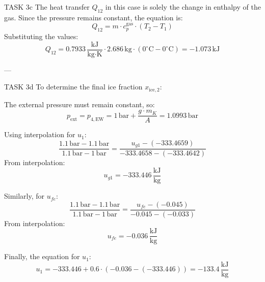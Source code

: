 TASK 3c  
The heat transfer \( Q_{12} \) in this case is solely the change in enthalpy of the gas. Since the pressure remains constant, the equation is:  
\[
Q_{12} = m \cdot c_p^{\text{gas}} \cdot (T_2 - T_1)
\]  
Substituting the values:  
\[
Q_{12} = 0.7933 \, \frac{\text{kJ}}{\text{kg·K}} \cdot 2.686 \, \text{kg} \cdot (0^\circ\text{C} - 0^\circ\text{C}) = -1.073 \, \text{kJ}
\]  

---

TASK 3d  
To determine the final ice fraction \( x_{\text{ice},2} \):  

The external pressure must remain constant, so:  
\[
p_{\text{ext}} = p_{4,\text{EW}} = 1 \, \text{bar} + \frac{g \cdot m_K}{A} = 1.0993 \, \text{bar}
\]  

Using interpolation for \( u_1 \):  
\[
\frac{1.1 \, \text{bar} - 1.1 \, \text{bar}}{1.1 \, \text{bar} - 1 \, \text{bar}} = \frac{u_{g1} - (-333.4659)}{-333.4658 - (-333.4642)}
\]  
From interpolation:  
\[
u_{g1} = -333.446 \, \frac{\text{kJ}}{\text{kg}}
\]  

Similarly, for \( u_{fe} \):  
\[
\frac{1.1 \, \text{bar} - 1.1 \, \text{bar}}{1.1 \, \text{bar} - 1 \, \text{bar}} = \frac{u_{fe} - (-0.045)}{-0.045 - (-0.033)}
\]  
From interpolation:  
\[
u_{fe} = -0.036 \, \frac{\text{kJ}}{\text{kg}}
\]  

Finally, the equation for \( u_1 \):  
\[
u_1 = -333.446 + 0.6 \cdot (-0.036 - (-333.446)) = -133.4 \, \frac{\text{kJ}}{\text{kg}}
\]
